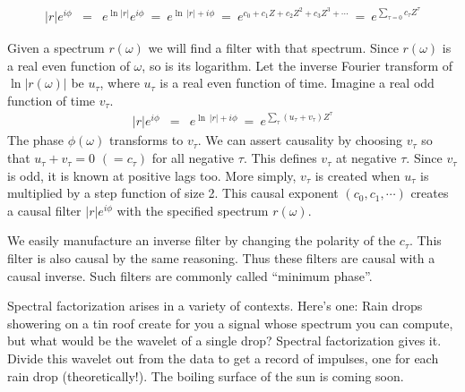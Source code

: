 \par
\begin{eqnarray}
|r|e^{i\phi} &=&
e^{\ln|r|}e^{i\phi} \ =\
e^{\ln\,|r| + i\phi} \ =\  
e^{c_0+c_1Z+c_2Z^2+c_3Z^3+\cdots} \ =\ 
e^{\sum_{\tau=0} c_\tau Z^\tau}
\end{eqnarray}
\par\noindent
Given a spectrum $r(\omega)$ we will find a filter with that spectrum.
Since $r(\omega)$ is a real even function of $\omega$, so is its logarithm.
Let the inverse Fourier transform of $\ln |r(\omega)|$ be $u_\tau$,
where $u_\tau$ is a real even function of time.
Imagine a real odd function of time $v_\tau$.
\begin{eqnarray}
|r|e^{i\phi} &=& e^{\ln\,|r| + i\phi} \ =\  e^{\sum_\tau (u_\tau+v_\tau) Z^\tau}
\end{eqnarray}
The phase $\phi(\omega)$ transforms to $v_\tau$.
We can assert causality
by choosing $v_\tau$ so that $u_\tau+v_\tau=0$ $ (=c_\tau)$ for all negative $\tau$.
This defines $v_\tau$ at negative $\tau$.
Since $v_\tau$ is odd, it is known at positive lags too.
More simply,
$v_\tau$ is created when $u_\tau$ is multiplied by a step function of size 2.  
This causal exponent
$(c_0,c_1,\cdots)$
creates a causal filter $|r|e^{i\phi}$
with the specified spectrum $r(\omega)$.

\par
We easily manufacture an inverse filter by changing the polarity of the $c_\tau$.
This filter is also causal by the same reasoning.
Thus these filters are causal with a causal inverse.
Such filters are commonly called ``minimum phase''.

\par
Spectral factorization arises in a variety of contexts. Here's one:
Rain drops showering on a tin roof create for you a signal
whose spectrum you can compute,
but what would be the wavelet of a single drop?
Spectral factorization gives it.
Divide this wavelet out from the data
to get a record of impulses, one for each rain drop (theoretically!).
The boiling surface of the sun is coming soon.


